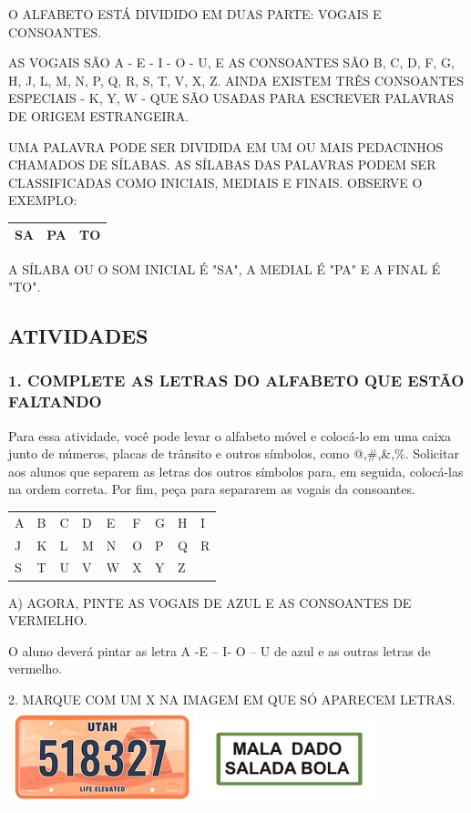 O ALFABETO ESTÁ DIVIDIDO EM DUAS PARTE: VOGAIS E CONSOANTES.

AS VOGAIS SÃO A - E - I - O - U, E AS CONSOANTES SÃO B, C, D, F, G, H, J,
L, M, N, P, Q, R, S, T, V, X, Z. AINDA EXISTEM TRÊS CONSOANTES ESPECIAIS - K,
Y, W - QUE SÃO USADAS PARA ESCREVER PALAVRAS DE ORIGEM ESTRANGEIRA.

UMA PALAVRA PODE SER DIVIDIDA EM UM OU MAIS PEDACINHOS CHAMADOS DE
SÍLABAS. AS SÍLABAS DAS PALAVRAS PODEM SER CLASSIFICADAS COMO INICIAIS, MEDIAIS E FINAIS. OBSERVE O EXEMPLO:

\begin{longtable}[]{@{}lll@{}}
\toprule
\textbf{SA} & \textbf{PA} & \textbf{TO}\tabularnewline
\bottomrule
\end{longtable}

A SÍLABA OU O SOM INICIAL É "SA", A MEDIAL É "PA" E A FINAL É "TO".

\subsection{ATIVIDADES}\label{atividades}

\subsubsection{1. COMPLETE AS LETRAS DO ALFABETO QUE ESTÃO
FALTANDO}\label{complete-as-letras-do-alfabeto-que-estuxe3o-faltando}

Para essa atividade, você pode levar o alfabeto móvel e colocá-lo em uma
caixa junto de números, placas de trânsito e outros símbolos, como
@,\#,\&,\%. Solicitar aos alunos que separem as letras dos outros símbolos para,
em seguida, colocá-las na ordem correta. Por fim, peça para separarem as vogais
da consoantes.

\begin{longtable}[]{@{}lllllllll@{}}
\toprule
A & B & C & D & E & F & G & H & I\tabularnewline
J & K & L & M & N & O & P & Q & R\tabularnewline
S & T & U & V & W & X & Y & Z\tabularnewline
\bottomrule
\end{longtable}

A) AGORA, PINTE AS VOGAIS DE AZUL E AS CONSOANTES DE VERMELHO.

O aluno deverá pintar as letra A -E -- I- O -- U de azul e as
outras letras de vermelho.

2. MARQUE COM UM X NA IMAGEM EM QUE SÓ APARECEM
LETRAS.\includegraphics[width=2.18819in,height=1.11111in]{media/image2.png}\includegraphics[width=2.03681in,height=1.04861in]{media/image3.png}

